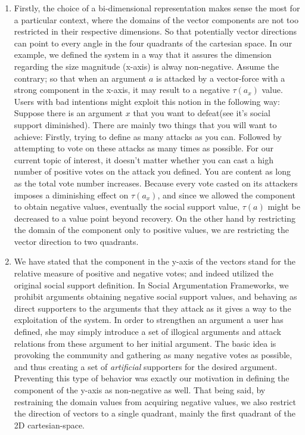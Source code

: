 \documentclass{article}
\begin{document}
\begin{enumerate}
\item Firstly, the choice of  a bi-dimensional representation makes sense the most for a particular context, where the domains of the vector components are not too restricted in their respective dimensions. So that potentially vector directions can point to every angle in the four quadrants of the cartesian space. In our example, we defined the system in a way that it assures the dimension regarding the size magnitude (x-axis) is alway non-negative. Assume the contrary; so that when an argument $a$ is attacked by a vector-force with a strong component in the x-axis, it may result to a negative $\tau(a_x)$ value. Users with bad intentions might exploit this notion in the following way: Suppose there is an argument $x$ that you want to defeat(see it's social support diminished). There are mainly two things that you will want to achieve: Firstly, trying to define as many attacks as you can. Followed by attempting to vote on these attacks as many times as possible. For our current topic of interest, it doesn't matter whether you can cast a high number of positive votes on the attack you defined. You are content as long as the total vote number increases. Because every vote casted on its attackers imposes a diminishing effect on $\tau(a_x)$, and since we allowed the component to obtain negative values, eventually the social support value, $\tau(a)$ might be decreased to a value point beyond recovery. On the other hand by restricting the domain of the component only to positive values, we are restricting the vector direction to two quadrants.

\item We have stated that the component in the y-axis of the vectors stand for the relative measure of positive and negative votes; and indeed utilized the original social support definition. In Social Argumentation Frameworks, we prohibit arguments obtaining negative social support values, and behaving as direct supporters to the arguments that they attack as it gives a way to the exploitation of the system. In order to strengthen an argument a user has defined, she may simply introduce a set of illogical arguments and attack relations from these argument to her initial argument. The basic idea is provoking the community and gathering as many negative votes as possible, and thus creating a set of \textit{artificial} supporters for the desired argument. Preventing this type of behavior was exactly our motivation in defining the component of the y-axis as non-negative as well. That being said, by restraining the domain values from acquiring negative values, we also restrict the direction of vectors to a single quadrant, mainly the first quadrant of the 2D cartesian-space.


\end{enumerate}
\end{document}

